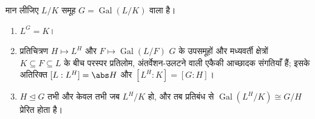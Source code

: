 \begin{theorem}[गाल्वा सिद्धांत की मूल प्रमेय]
\label{thm:b3:galois:fundamental}
मान लीजिए $L/K$ समूह $G =
\operatorname{Gal}(L/K)$ वाला  है।
\begin{enumerate}
  \item $L^G = K$।
  \item प्रतिचित्रण $H \mapsto L^H$ और $F \mapsto
        \operatorname{Gal}(L/F)$ $G$ के उपसमूहों और
        मध्यवर्ती क्षेत्रों $K \subseteq F \subseteq L$ के बीच परस्पर प्रतिलोम,
        अंतर्वेशन-उलटने वाली एकैकी आच्छादक संगतियाँ हैं; इसके
        अतिरिक्त $[L : L^H] = \abs H$ और $[L^H : K] = [G : H]$।
  \item $H \trianglelefteq G$ तभी और केवल तभी जब $L^H/K$  हो, और तब प्रतिबंध
        से $\operatorname{Gal}(L^H/K) \cong
        G/H$ प्रेरित होता है।
\end{enumerate}
\end{theorem}

